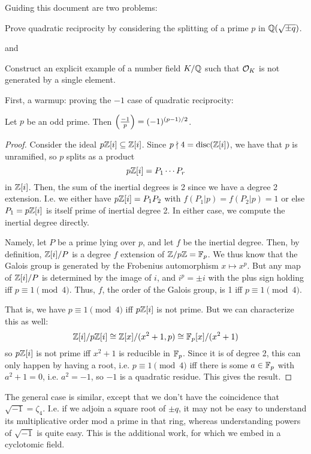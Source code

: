 Guiding this document are two problems:

\begin{exercise} Prove quadratic reciprocity by considering the splitting of a prime $p$ in $\mathbb{Q}(\sqrt{\pm q})$. \end{exercise}

and

\begin{exercise} Construct an explicit example of a number field $K/\mathbb{Q}$ such that $\mathcal{O}_K$ is not generated by a single element. \end{exercise}

First, a warmup: proving the $-1$ case of quadratic reciprocity:

\begin{thm} Let $p$ be an odd prime. Then $\left(\frac{-1}{p}\right) = (-1)^{(p-1)/2}$. \end{thm}
\begin{proof}
	Consider the ideal $p\mathbb{Z}[i] \subseteq \mathbb{Z}[i]$. Since $p \nmid 4 = \operatorname{disc}(\mathbb{Z}[i])$, we have that $p$ is unramified, so $p$ splits as a product
	\[ p\mathbb{Z}[i] = P_1\cdots P_r \]
	in $\mathbb{Z}[i]$. Then, the sum of the inertial degrees is 2 since we have a degree 2 extension. I.e. we either have $p\mathbb{Z}[i] = P_1P_2$ with $f(P_1|p) = f(P_2|p) = 1$ or else $P_1 = p\mathbb{Z}[i]$ is itself prime of inertial degree 2. In either case, we compute the inertial degree directly.
	
	Namely, let $P$ be a prime lying over $p$, and let $f$ be the inertial degree. Then, by definition, $\mathbb{Z}[i]/P$ is a degree $f$ extension of $\mathbb{Z}/p\mathbb{Z} = \mathbb{F}_p$. We thus know that the Galois group is generated by the Frobenius automorphism $x \mapsto x^p$. But any map of $\mathbb{Z}[i]/P$ is determined by the image of $i$, and $i^p = \pm i$ with the plus sign holding iff $p \equiv 1 \pmod{4}$. Thus, $f$, the order of the Galois group, is 1 iff $p \equiv 1 \pmod{4}$.
	
	That is, we have $p \equiv 1 \pmod{4}$ iff $p\mathbb{Z}[i]$ is not prime. But we can characterize this as well:
	\[ \mathbb{Z}[i]/p\mathbb{Z}[i] \cong \mathbb{Z}[x]/(x^2+1,p) \cong \mathbb{F}_p[x]/(x^2+1) \]
	so $p\mathbb{Z}[i]$ is not prime iff $x^2+1$ is reducible in $\mathbb{F}_p$. Since it is of degree 2, this can only happen by having a root, i.e. $p \equiv 1 \pmod{4}$ iff there is some $a \in \mathbb{F}_p$ with $a^2+1=0$, i.e. $a^2=-1$, so $-1$ is a quadratic residue. This gives the result.
\end{proof}

The general case is similar, except that we don't have the coincidence that $\sqrt{-1} = \zeta_4$. I.e. if we adjoin a square root of $\pm q$, it may not be easy to understand its multiplicative order mod a prime in that ring, whereas understanding powers of $\sqrt{-1}$ is quite easy. This is the additional work, for which we embed in a cyclotomic field.

